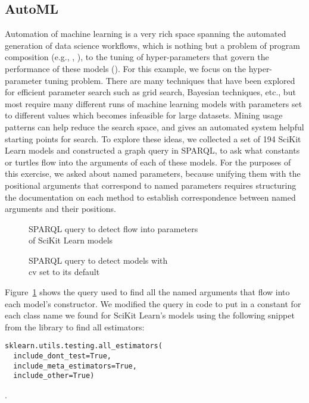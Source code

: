 \subsection{AutoML}
Automation of machine learning is a very rich space spanning the automated generation of data science workflows, which is nothing but a problem of program composition (e.g., \cite{Feurer:2015:ERA:2969442.2969547}, \cite{Olson:2016:ETP:2908812.2908918}), to the tuning of hyper-parameters that govern the performance of these models (\cite{Feurer:2014:UMI:3015544.3015549}).  For this example, we focus on the hyper-parameter tuning problem.  There are many techniques that have been explored for efficient parameter search such as grid search, Bayesian techniques, etc., but most require many different runs of machine learning models with parameters set to different values which becomes infeasible for large datasets.  Mining usage patterns can help reduce the search space, and gives an automated system helpful starting points for search.  To explore these ideas, we collected a set of 194 SciKit Learn models and constructed a graph query in SPARQL, to ask what constants or turtles flow into the arguments of each of these models.  For the purposes of this exercise, we asked about named parameters, because unifying them with the positional arguments that correspond to named parameters requires structuring the documentation on each method to establish correspondence between named arguments and their positions.  

\begin{figure}[h]
\begin{centering}

\caption{SPARQL query to detect flow into parameters\\
of SciKit Learn models}
\label{code:query_constructors}
\end{centering}
\end{figure}

\begin{figure}[h]
\begin{centering}

\caption{SPARQL query to detect models with \\
cv set to its default}
\label{code:query_constructors_omitted}
\end{centering}
\end{figure}

Figure~\ref{code:query_constructors} shows the query used to find all the named arguments that flow into each model's constructor.  We modified the query in code to put in a constant for each class name we found for SciKit Learn's models using the following snippet from the library to find all estimators:
\begin{verbatim}
sklearn.utils.testing.all_estimators(
  include_dont_test=True, 
  include_meta_estimators=True, 
  include_other=True)
\end{verbatim}.  


